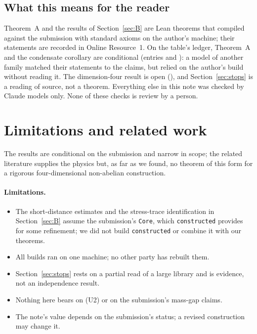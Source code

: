 \documentclass[11pt,a4paper]{article}
\newcommand{\lean}[1]{\texttt{#1}}
\theoremstyle{plain}
\begin{document}
\subsection{What this means for the reader}
Theorem~A and the results of Section~\ref{sec:B} are Lean theorems that compiled against the submission with standard axioms on the author's machine; their statements are recorded in Online Resource~1. On the table's ledger, Theorem~A and the condensate corollary are conditional (entries  and ): a model of another family matched their statements to the claims, but relied on the author's build without reading it. The dimension-four result is open (), and Section~\ref{sec:stops} is a reading of source, not a theorem. Everything else in this note was checked by Claude models only. None of these checks is review by a person.

\section{Limitations and related work}\label{sec:limits}

The results are conditional on the submission and narrow in scope; the related literature supplies the physics but, as far as we found, no theorem of this form for a rigorous four-dimensional non-abelian construction.

\paragraph{Limitations.}
\begin{itemize}
\item The short-distance estimates and the stress-trace identification in Section~\ref{sec:B} assume the submission's \lean{Core}, which \lean{constructed} provides for some refinement; we did not build \lean{constructed} or combine it with our theorems.
\item All builds ran on one machine; no other party has rebuilt them.
\item Section~\ref{sec:stops} rests on a partial read of a large library and is evidence, not an independence result.
\item Nothing here bears on (U2) or on the submission's mass-gap claims.
\item The note's value depends on the submission's status; a revised construction may change it.
\end{itemize}
\end{document}
